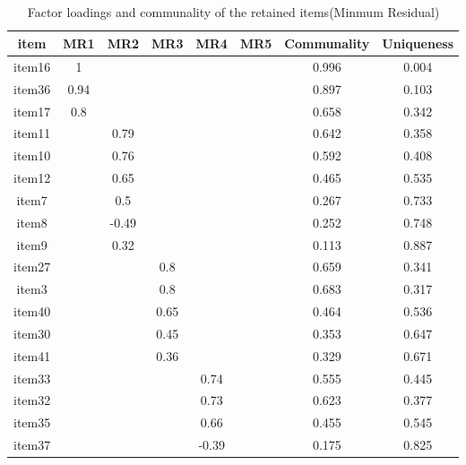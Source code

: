\clearpage
\makeatletter
\efloat@restorefloats
\makeatother


\begin{appendix}
\section{}
\begin{table}[tbp]

\begin{center}
\begin{threeparttable}

\caption{\label{tab:MinResTab}Factor loadings and communality of the retained items(Minmum Residual)}

\small{

\begin{tabular}{cccccccc}
\toprule
item & \multicolumn{1}{c}{MR1} & \multicolumn{1}{c}{MR2} & \multicolumn{1}{c}{MR3} & \multicolumn{1}{c}{MR4} & \multicolumn{1}{c}{MR5} & \multicolumn{1}{c}{Communality} & \multicolumn{1}{c}{Uniqueness}\\
\midrule
item16 & 1 &  &  &  &  & 0.996 & 0.004\\
item36 & 0.94 &  &  &  &  & 0.897 & 0.103\\
item17 & 0.8 &  &  &  &  & 0.658 & 0.342\\
item11 &  & 0.79 &  &  &  & 0.642 & 0.358\\
item10 &  & 0.76 &  &  &  & 0.592 & 0.408\\
item12 &  & 0.65 &  &  &  & 0.465 & 0.535\\
item7 &  & 0.5 &  &  &  & 0.267 & 0.733\\
item8 &  & -0.49 &  &  &  & 0.252 & 0.748\\
item9 &  & 0.32 &  &  &  & 0.113 & 0.887\\
item27 &  &  & 0.8 &  &  & 0.659 & 0.341\\
item3 &  &  & 0.8 &  &  & 0.683 & 0.317\\
item40 &  &  & 0.65 &  &  & 0.464 & 0.536\\
item30 &  &  & 0.45 &  &  & 0.353 & 0.647\\
item41 &  &  & 0.36 &  &  & 0.329 & 0.671\\
item33 &  &  &  & 0.74 &  & 0.555 & 0.445\\
item32 &  &  &  & 0.73 &  & 0.623 & 0.377\\
item35 &  &  &  & 0.66 &  & 0.455 & 0.545\\
item37 &  &  &  & -0.39 &  & 0.175 & 0.825\\

\end{tabular}}
\end{threeparttable}
\end{center}
\end{table}
\end{appendix}
